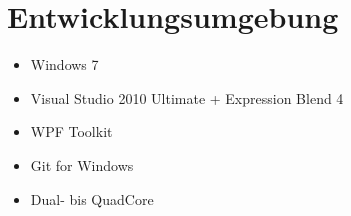 \section{Entwicklungsumgebung}

\begin{itemize}
	\item Windows 7
	\item Visual Studio 2010 Ultimate + Expression Blend 4
	\item WPF Toolkit
	\item Git for Windows
	\item Dual- bis QuadCore
\end{itemize}

